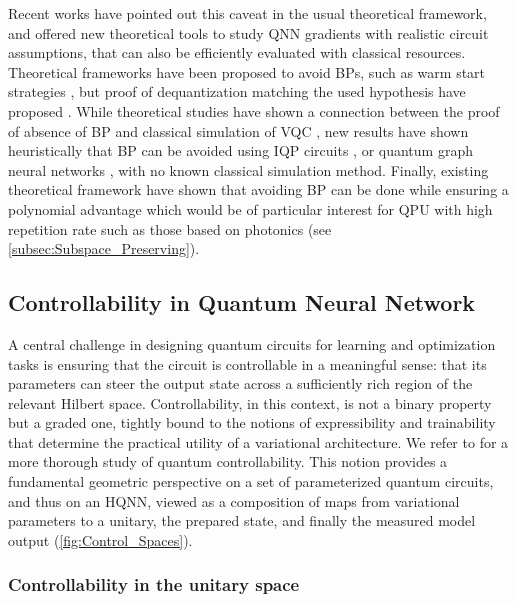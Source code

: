 \documentclass[aps,10pt,groupedaddress,prx,superscriptaddress,twocolumn,balancelastpage, tightenlines]{revtex4-2}
\theoremstyle{plain}  %
\begin{document}
Recent works \cite{letcher_tight_2024} have pointed out this caveat in the usual theoretical framework, and offered new theoretical tools to study QNN gradients with realistic circuit assumptions, that can also be efficiently evaluated with classical resources. Theoretical frameworks have been proposed to avoid BPs, such as warm start strategies \cite{puig_variational_2025, mhiri_unifying_2025, shen_characterizing_2026}, but proof of dequantization matching the used hypothesis have proposed \cite{lerch_efficient_2024}. While theoretical studies have shown a connection between the proof of absence of BP and classical simulation of VQC \cite{cerezo_does_2025}, new results have shown heuristically that BP can be avoided using \gls{IQP} circuits \cite{recio-armengol_train_2025}, or quantum graph neural networks \cite{raj_scalable_2026}, with no known classical simulation method. Finally, existing theoretical framework have shown that avoiding BP can be done while ensuring a polynomial advantage which would be of particular interest for QPU with high repetition rate such as those based on photonics (see \autoref{subsec:Subspace_Preserving}).


\subsection{Controllability in Quantum Neural Network}\label{subsec:controllability_QNN}

A central challenge in designing quantum circuits for learning and optimization tasks is ensuring that the circuit is controllable in a meaningful sense: that its parameters can steer the output state across a sufficiently rich region of the relevant Hilbert space. Controllability, in this context, is not a binary property but a graded one, tightly bound to the notions of expressibility and trainability that determine the practical utility of a variational architecture. We refer to \cite{dalessandro_introduction_2021} for a more thorough study of quantum controllability. This notion provides a fundamental geometric perspective on a set of parameterized quantum circuits, and thus on an HQNN, viewed as a composition of maps from variational parameters to a unitary, the prepared state, and finally the measured model output (\autoref{fig:Control_Spaces}).

\subsubsection{Controllability in the unitary space}
\end{document}
